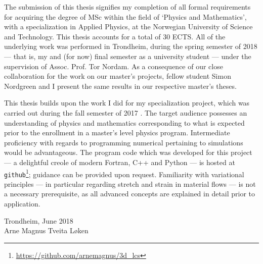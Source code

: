 The submission of this thesis signifies my completion of all formal
requirements for acquiring the degree of MSc within the field of `Physics and
Mathematics', with a specialization in Applied Physics, at the Norwegian
University of Science and Technology. This thesis accounts for a total of 30
ECTS. All of the underlying work was performed in Trondheim, during the spring
semester of 2018 --- that is, my  and (for now) final semester as a
university student --- under the supervision of Assoc. Prof. Tor Nordam. As a
consequence of our close collaboration for the work on our master's projects,
fellow student Simon Nordgreen and I present the same results in our respective
master's theses.

This thesis builds upon the work I did for my specialization project, which was
carried out during the fall semester of 2017 \parencite{loken2017sensitivity}.
The target audience possesses an understanding of physics and mathematics
corresponding to what is expected prior to the enrollment in a master's level
physics program. Intermediate proficiency with regards to programming numerical
pertaining to simulations would be advantageous. The program code which was
developed for this project --- a delightful creole of modern Fortran, C++ and
Python --- is hosted at
\texttt{github}\footnote{\url{https://github.com/arnemagnus/3d_lcs}}; guidance
can be provided upon request. Familiarity with variational principles --- in
particular regarding stretch and strain in material flows --- is not a
necessary prerequisite, as all advanced concepts are explained in detail prior
to application.


\begin{minipage}[t]{\textwidth}
    \begin{flushright}
    Trondheim, June 2018\\
    Arne Magnus Tveita Løken
    \end{flushright}
\end{minipage}
